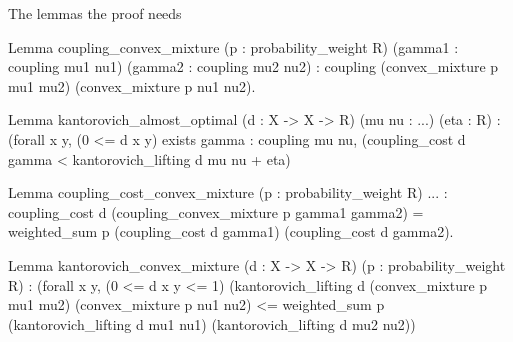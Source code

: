 \documentclass[10pt,aspectratio=169]{beamer}
\makeatletter
\newcommand{\ptag}[1]{\hfill\textit{#1}}
\newcommand{\modelscript}{%
    \pline{0}{Theorem kantorovich\_models\_ica :}
    \pline{0}{\ \ fuzzy\_models kantorovich\_algebra (@ica\_theory R).}
    \pline{1}{Proof.}
    \pline{1}{\ \ rewrite /fuzzy\_models.}
    \pline{1}{\ \ move => Y phi Hphi.}
    \pline{1}{\ \ case: Hphi => [p | p | p q | p eps delta ...] rho.}
    \pline{2}{\ \ - by rewrite kantorovich\_eval\_op}
    \pline{2}{\ \ \ \ \ \ convex\_mixture\_idem.\ptag{Idem}}
    \pline{2}{\ \ - by rewrite !kantorovich\_eval\_op}
    \pline{2}{\ \ \ \ \ \ convex\_mixture\_skew\_comm.\ptag{SkewComm}}
    \pline{2}{\ \ - by rewrite !kantorovich\_eval\_op}
    \pline{2}{\ \ \ \ \ \ convex\_mixture\_skew\_assoc.\ptag{SkewAssoc}}
    \pline{3}{\ \ - rewrite !kantorovich\_eval\_op.\ptag{Interp}}
    \pline{4}{\ \ \ \ apply: (le\_trans}
    \pline{4}{\ \ \ \ \ \ (kantorovich\_convex\_mixture \_ \_ \_ \_ \_ Hd)).}
    \pline{5}{\ \ \ \ apply: weighted\_sum\_le.}
    \pline{6}{\ \ \ \ - apply: (le\_trans (interpretation\_nexp}
    \pline{6}{\ \ \ \ \ \ \ \ rho (inord 0) (inord 2))).}
    \pline{7}{\ \ \ \ \ \ by rewrite /= /ica\_interp\_rel !inordK.}
    \pline{8}{\ \ \ \ - apply: (le\_trans (interpretation\_nexp}
    \pline{8}{\ \ \ \ \ \ \ \ rho (inord 1) (inord 3))).}
    \pline{8}{\ \ \ \ \ \ by rewrite /= /ica\_interp\_rel !inordK.}
    \pline{8}{Qed.}
}
\makeatother
\begin{document}
    \begin{frame}[fragile]{The lemmas the proof needs}
        \begin{srcbox}
Lemma coupling_convex_mixture (p : probability_weight R)
    (gamma1 : coupling mu1 nu1) (gamma2 : coupling mu2 nu2) :
  coupling (convex_mixture p mu1 mu2) (convex_mixture p nu1 nu2).
        \end{srcbox}
        \begin{srcbox}
Lemma kantorovich_almost_optimal (d : X -> X -> R) (mu nu : ...) (eta : R) :
  (forall x y, (0 <= d x y)%
  exists gamma : coupling mu nu,
    (coupling_cost d gamma < kantorovich_lifting d mu nu + eta)%

Lemma coupling_cost_convex_mixture (p : probability_weight R) ... :
  coupling_cost d (coupling_convex_mixture p gamma1 gamma2)
    = weighted_sum p (coupling_cost d gamma1) (coupling_cost d gamma2).

Lemma kantorovich_convex_mixture (d : X -> X -> R) (p : probability_weight R) :
  (forall x y, (0 <= d x y <= 1)%
  (kantorovich_lifting d (convex_mixture p mu1 mu2) (convex_mixture p nu1 nu2)
     <= weighted_sum p (kantorovich_lifting d mu1 nu1)
                       (kantorovich_lifting d mu2 nu2))%
        \end{srcbox}
            \end{frame}

            \newcommand{\modpane}[1]{%
                \begin{scriptbox}[fontupper=\ttfamily\fontsize{5.8pt}{6.6pt}\selectfont\frenchspacing]%
                    \pstep{#1}\modelscript
            \end{scriptbox}}
\end{document}
